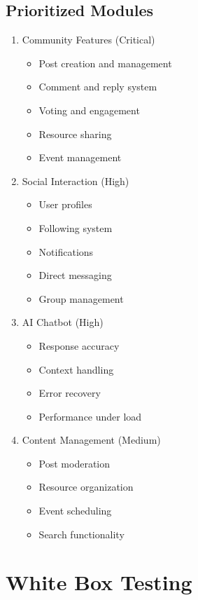 \subsection{Prioritized Modules}
\begin{enumerate}
    \item Community Features (Critical)
    \begin{itemize}
        \item Post creation and management
        \item Comment and reply system
        \item Voting and engagement
        \item Resource sharing
        \item Event management
    \end{itemize}
    
    \item Social Interaction (High)
    \begin{itemize}
        \item User profiles
        \item Following system
        \item Notifications
        \item Direct messaging
        \item Group management
    \end{itemize}
    
    \item AI Chatbot (High)
    \begin{itemize}
        \item Response accuracy
        \item Context handling
        \item Error recovery
        \item Performance under load
    \end{itemize}
    
    \item Content Management (Medium)
    \begin{itemize}
        \item Post moderation
        \item Resource organization
        \item Event scheduling
        \item Search functionality
    \end{itemize}
\end{enumerate}

\section{White Box Testing}


